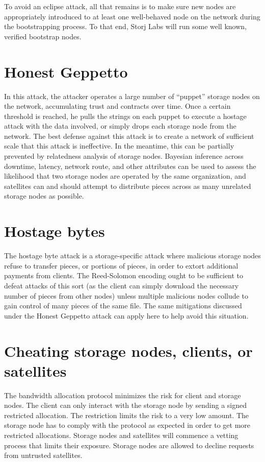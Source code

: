 \documentclass[11pt,fleqn,openany]{book}
\begin{document}
To avoid an eclipse attack, all that remains
is to make sure new nodes are appropriately introduced to at least one
well-behaved node on the network during the bootstrapping process.
To that end, Storj Labs will run some well known, verified bootstrap nodes.

\section{Honest Geppetto}

In this attack,
the attacker operates a large number of ``puppet'' storage nodes on the network,
accumulating trust and contracts over time. Once a certain threshold is reached,
he pulls the strings on each puppet to execute a hostage attack with the data
involved, or simply drops each storage node from the network. The best defense
against this attack is to create a network of sufficient scale that this attack
is ineffective. In the meantime, this can be partially prevented by relatedness
analysis of storage nodes. Bayesian inference across downtime, latency, network
route, and other
attributes can be used to assess the likelihood that two storage nodes are
operated by the same organization, and satellites can and should attempt to
distribute pieces across as many unrelated storage nodes as possible.

\section{Hostage bytes}

The hostage byte attack is a storage-specific attack where malicious storage
nodes
refuse to transfer pieces, or portions of pieces, in order to extort additional
payments from clients. The Reed-Solomon encoding ought to be sufficient to
defeat attacks of this sort (as the client can simply download the necessary
number of pieces from other nodes) unless multiple malicious nodes collude to
gain control of many pieces of the same file. The same mitigations discussed
under the Honest Geppetto attack can apply here to help avoid this situation.

\section{Cheating storage nodes, clients, or satellites}

The bandwidth allocation protocol minimizes the risk for client and storage
nodes.
The client can only interact with the storage node by sending a signed
restricted allocation.
The restriction limits the risk to a very low amount.
The storage node has to comply with the protocol as expected in order to get
more restricted allocations.
Storage nodes and satellites will commence a vetting process that limits their
exposure.
Storage nodes are allowed to decline requests from untrusted satellites.
\end{document}
